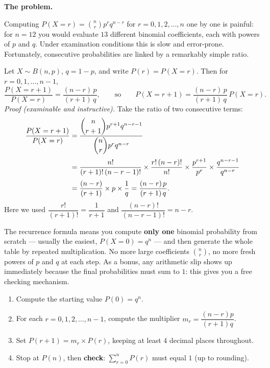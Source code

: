 \documentclass[11pt]{article}
\newcounter{popsec}
\newcounter{popsub}
\newcommand{\courssub}[1]{%
  \stepcounter{popsub}%
  \par\vspace{9pt}\noindent{\popxbold\fontsize{11.5}{13}\selectfont\color{popink}{\color{poporange}\thepopsec.\thepopsub}\hspace{6pt}#1}\par\nopagebreak\vspace{4pt}
}
\begin{document}
\courssub{The Recurrence Formula}

\textbf{The problem.}\par
Computing $P(X=r)=\binom{n}{r}p^{r}q^{n-r}$ for $r=0,1,2,\dots,n$ one by one is painful: for $n=12$ you would evaluate $13$ different binomial coefficients, each with powers of $p$ and $q$. Under examination conditions this is slow and error-prone. Fortunately, consecutive probabilities are linked by a remarkably simple ratio.

\begin{propriete}
Let $X\sim B(n,p)$, $q=1-p$, and write $P(r)=P(X=r)$. Then for $r=0,1,\dots,n-1$,
\[ \frac{P(X=r+1)}{P(X=r)}=\frac{(n-r)\,p}{(r+1)\,q},
\qquad\text{so}\qquad
P(X=r+1)=\frac{(n-r)\,p}{(r+1)\,q}\,P(X=r). \]
\emph{Proof (examinable and instructive).} Take the ratio of two consecutive terms:
\begin{align*}
\frac{P(X=r+1)}{P(X=r)}
&=\frac{\dbinom{n}{r+1}p^{r+1}q^{n-r-1}}{\dbinom{n}{r}p^{r}q^{n-r}}\\[2pt]
&=\frac{n!}{(r+1)!\,(n-r-1)!}\times\frac{r!\,(n-r)!}{n!}\times\frac{p^{r+1}}{p^{r}}\times\frac{q^{n-r-1}}{q^{n-r}}\\[2pt]
&=\frac{(n-r)}{(r+1)}\times p\times\frac{1}{q}
=\frac{(n-r)\,p}{(r+1)\,q}.
\end{align*}
Here we used $\dfrac{r!}{(r+1)!}=\dfrac{1}{r+1}$ and $\dfrac{(n-r)!}{(n-r-1)!}=n-r$.
\end{propriete}

\begin{exemplebox}
The recurrence formula means you compute \textbf{only one} binomial probability from scratch — usually the easiest, $P(X=0)=q^{n}$ — and then generate the whole table by repeated multiplication. No more large coefficients $\binom{n}{r}$, no more fresh powers of $p$ and $q$ at each step. As a bonus, any arithmetic slip shows up immediately because the final probabilities must sum to $1$: this gives you a free checking mechanism.
\end{exemplebox}

\begin{methode}
\begin{enumerate}
\item Compute the starting value $P(0)=q^{n}$.
\item For each $r=0,1,2,\dots,n-1$, compute the multiplier $m_r=\dfrac{(n-r)p}{(r+1)q}$.
\item Set $P(r+1)=m_r\times P(r)$, keeping at least $4$ decimal places throughout.
\item Stop at $P(n)$, then \textbf{check}: $\sum_{r=0}^{n}P(r)$ must equal $1$ (up to rounding).
\end{enumerate}
\end{methode}
\end{document}
